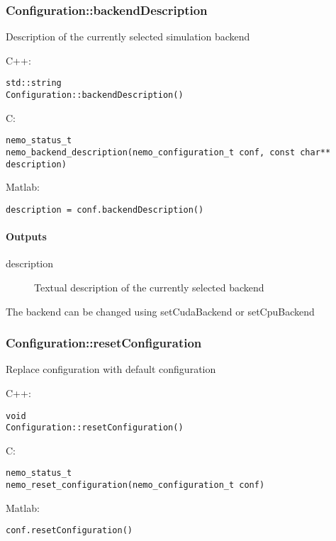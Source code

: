 \clearpage
\subsubsection*{Configuration::backendDescription}
\label{fn: backendDescription}
Description of the currently selected simulation backend


\noindent C++:
\begin{lstlisting}[aboveskip=2pt]
std::string
Configuration::backendDescription()
\end{lstlisting}

\noindent C:
\begin{lstlisting}[aboveskip=2pt]
nemo_status_t
nemo_backend_description(nemo_configuration_t conf, const char** description)
\end{lstlisting}

\noindent Matlab:
\begin{lstlisting}[aboveskip=2pt]
description = conf.backendDescription()
\end{lstlisting}
\paragraph{Outputs}
\begin{description}
\item[description] Textual description of the currently selected backend
\end{description}
The backend can be changed using setCudaBackend or setCpuBackend

\clearpage
\subsubsection*{Configuration::resetConfiguration}
\label{fn: resetConfiguration}
Replace configuration with default configuration


\noindent C++:
\begin{lstlisting}[aboveskip=2pt]
void
Configuration::resetConfiguration()
\end{lstlisting}

\noindent C:
\begin{lstlisting}[aboveskip=2pt]
nemo_status_t
nemo_reset_configuration(nemo_configuration_t conf)
\end{lstlisting}

\noindent Matlab:
\begin{lstlisting}[aboveskip=2pt]
conf.resetConfiguration()
\end{lstlisting}

